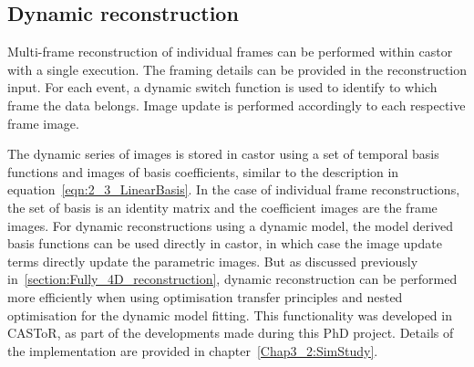 \subsection{Dynamic reconstruction}
Multi-frame reconstruction of individual frames can be performed within \gls{castor} with a single execution. The framing details can be provided in the reconstruction input. For each event, a dynamic switch function is used to identify to which frame the data belongs. Image update is performed accordingly to each respective frame image.

The dynamic series of images is stored in \gls{castor} using a set of temporal basis functions and images of basis coefficients, similar to the description in equation~\ref{eqn:2_3_LinearBasis}. 
In the case of individual frame reconstructions, the set of basis is an identity matrix and the coefficient images are the frame images. 
For dynamic reconstructions using a dynamic model, the model derived basis functions can be used directly in \gls{castor}, in which case the image update terms directly update the parametric images.
But as discussed previously in~\autoref{section:Fully_4D_reconstruction}, dynamic reconstruction can be performed more efficiently when using optimisation transfer principles and nested optimisation for the dynamic model fitting. This functionality was developed in CASToR, as part of the developments made during this PhD project. Details of the implementation are provided in chapter~\ref{Chap3_2:SimStudy}.

